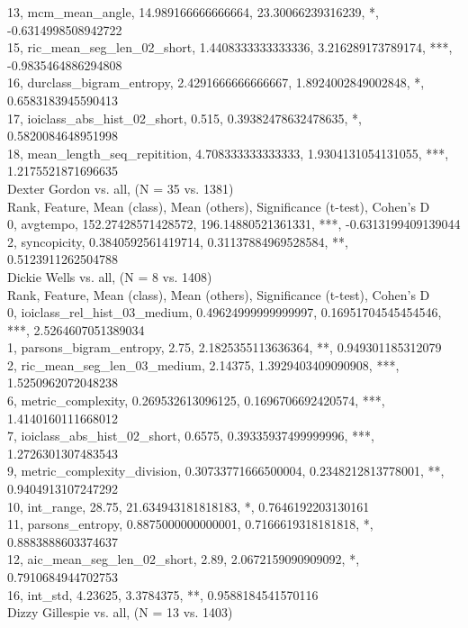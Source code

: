 13, mcm_mean_angle, 14.989166666666664, 23.30066239316239, *, -0.6314998508942722\\
15, ric_mean_seg_len_02_short, 1.4408333333333336, 3.216289173789174, ***, -0.9835464886294808\\
16, durclass_bigram_entropy, 2.4291666666666667, 1.8924002849002848, *, 0.6583183945590413\\
17, ioiclass_abs_hist_02_short, 0.515, 0.39382478632478635, *, 0.5820084648951998\\
18, mean_length_seq_repitition, 4.708333333333333, 1.9304131054131055, ***, 1.2175521871696635\\
Dexter Gordon vs. all, (N = 35 vs. 1381)\\
Rank, Feature, Mean (class), Mean (others), Significance (t-test), Cohen's D\\
0, avgtempo, 152.27428571428572, 196.14880521361331, ***, -0.6313199409139044\\
2, syncopicity, 0.3840592561419714, 0.31137884969528584, **, 0.5123911262504788\\
Dickie Wells vs. all, (N = 8 vs. 1408)\\
Rank, Feature, Mean (class), Mean (others), Significance (t-test), Cohen's D\\
0, ioiclass_rel_hist_03_medium, 0.49624999999999997, 0.16951704545454546, ***, 2.5264607051389034\\
1, parsons_bigram_entropy, 2.75, 2.1825355113636364, **, 0.949301185312079\\
2, ric_mean_seg_len_03_medium, 2.14375, 1.3929403409090908, ***, 1.5250962072048238\\
6, metric_complexity, 0.269532613096125, 0.1696706692420574, ***, 1.4140160111668012\\
7, ioiclass_abs_hist_02_short, 0.6575, 0.39335937499999996, ***, 1.2726301307483543\\
9, metric_complexity_division, 0.30733771666500004, 0.2348212813778001, **, 0.9404913107247292\\
10, int_range, 28.75, 21.634943181818183, *, 0.7646192203130161\\
11, parsons_entropy, 0.8875000000000001, 0.7166619318181818, *, 0.8883888603374637\\
12, aic_mean_seg_len_02_short, 2.89, 2.0672159090909092, *, 0.7910684944702753\\
16, int_std, 4.23625, 3.3784375, **, 0.9588184541570116\\
Dizzy Gillespie vs. all, (N = 13 vs. 1403)\\
